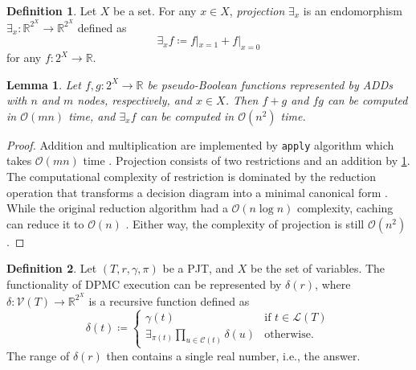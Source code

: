 \documentclass{article}
\newtheorem{lemma}{Lemma}
\theoremstyle{definition}
\newtheorem{definition}{Definition}
\theoremstyle{remark}
\begin{document}
\begin{definition} \label{def:projection}
  Let $X$ be a set. For any $x \in X$, \emph{projection} $\exists_x$ is an
  endomorphism $\exists_x\colon \mathbb{R}^{2^X} \to \mathbb{R}^{2^X}$ defined
  as
  \[
    \exists_xf \coloneqq f|_{x=1} + f|_{x=0}
  \]
  for any $f\colon 2^X \to \mathbb{R}$.
\end{definition}

\begin{lemma} \label{lemma:basic_ops}
  Let $f,g\colon 2^X \to \mathbb{R}$ be pseudo-Boolean functions represented by
  ADDs with $n$ and $m$ nodes, respectively, and $x \in X$. Then $f+g$ and $fg$
  can be computed in $\mathcal{O}(mn)$ time, and $\exists_xf$ can be computed in
  $\mathcal{O}(n^2)$ time.
\end{lemma}
\begin{proof}
  Addition and multiplication are implemented by \texttt{apply} algorithm which
  takes $\mathcal{O}(mn)$ time \cite{DBLP:journals/tc/Bryant86}. Projection
  consists of two restrictions and an addition by \cref{def:projection}. The
  computational complexity of restriction is dominated by the reduction
  operation that transforms a decision diagram into a minimal canonical form
  \cite{DBLP:journals/tc/Bryant86}. While the original reduction algorithm had a
  $\mathcal{O}(n \log n)$ complexity, caching can reduce it to $\mathcal{O}(n)$
  \cite{somenzi1998cudd}. Either way, the complexity of projection is still
  $\mathcal{O}(n^2)$.
\end{proof}

\begin{definition} \label{def:abstraction}
  Let $(T, r, \gamma, \pi)$ be a PJT, and $X$ be the set of variables. The
  functionality of \textsc{DPMC} execution can be represented by $\delta(r)$,
  where $\delta\colon \mathcal{V}(T) \to \mathbb{R}^{2^X}$ is a recursive
  function defined as
  \begin{equation} \label{eq:execution}
    \delta(t) \coloneqq
    \begin{cases}
      \gamma(t) & \text{if } t \in \mathcal{L}(T) \\
      \exists_{\pi(t)} \prod_{u \in \mathcal{C}(t)} \delta(u) & \text{otherwise.}
    \end{cases}
  \end{equation}
  The range of $\delta(r)$ then contains a single real number, i.e., the answer.
\end{definition}
\end{document}
